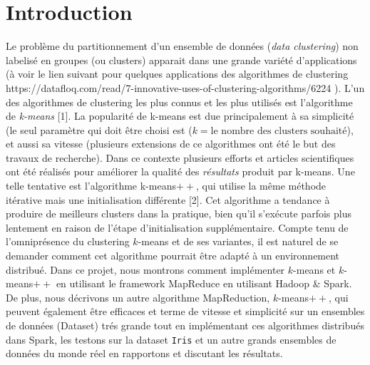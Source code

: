 \documentclass[12pt]{article}
\numberwithin{equation}{section}
\theoremstyle{plain}
\def\v1{\vskip0.2cm}
\begin{document}
\section{Introduction}
Le problème du partitionnement d'un ensemble de données (\textit{data clustering}) non labelisé en groupes (ou clusters) apparait  dans une grande variété d'applications (à voir le lien suivant pour quelques applications des algorithmes de clustering  \color{blue}https://datafloq.com/read/7-innovative-uses-of-clustering-algorithms/6224\color{black} ).
L'un des algorithmes de clustering les plus connus et les plus utilisés est l'algorithme de  \textit{k-means} [1]. \v1
La popularité de k-means est due principalement à sa simplicité (le seul paramètre qui doit être choisi est ($k= \text{le nombre des clusters souhaité}$), et aussi sa vitesse (plusieurs extensions de ce algorithmes ont été le but des travaux de recherche). \v1 
Dans ce contexte plusieurs efforts et articles scientifiques ont été réalisés pour améliorer la qualité des \textit{résultats} produit par k-means. Une telle tentative est l'algorithme k-means$++$, qui utilise la même méthode itérative mais une initialisation différente [2]. Cet algorithme a tendance à produire de meilleurs clusters dans la pratique, bien qu'il s'exécute parfois plus lentement en raison de l'étape d'initialisation supplémentaire. \v1
Compte tenu de l'omniprésence du clustering $k$-means et de ses variantes, il est naturel de se demander comment cet algorithme pourrait être adapté à un environnement distribué.
 Dans ce projet, nous montrons comment implémenter $k$-means et $k$-means$++$ en utilisant le framework MapReduce en utilisant Hadoop \& Spark. De plus, nous décrivons un autre algorithme MapReduction, $k$-means$++$, qui peuvent également être efficaces et terme de vitesse et simplicité sur un ensembles de données (Dataset) trés grande tout en implémentant ces algorithmes distribués dans Spark, les testons sur la dataset \texttt{Iris} et un autre grands ensembles de données du monde réel en rapportons et discutant les résultats.
\end{document}
